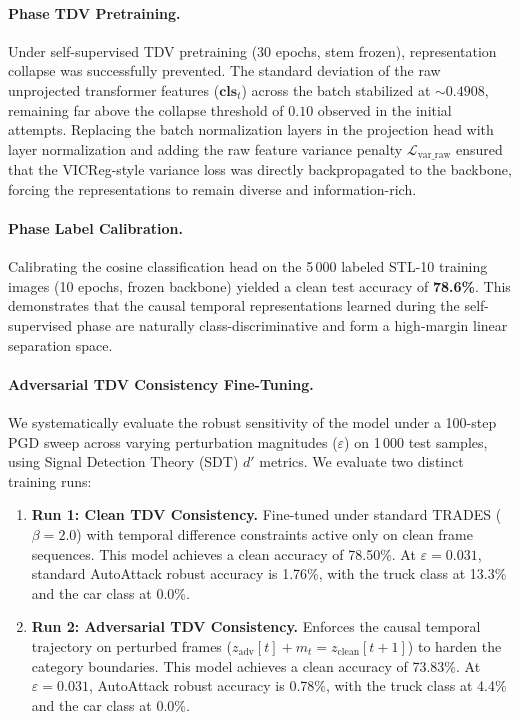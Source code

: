 \documentclass[12pt,a4paper]{article}
\begin{document}
\paragraph{Phase TDV Pretraining.} Under self-supervised TDV pretraining (30 epochs, stem frozen), representation collapse was successfully prevented. The standard deviation of the raw unprojected transformer features ($\mathbf{cls}_t$) across the batch stabilized at $\sim 0.4908$, remaining far above the collapse threshold of $0.10$ observed in the initial attempts. Replacing the batch normalization layers in the projection head with layer normalization and adding the raw feature variance penalty $\mathcal{L}_{\text{var\_raw}}$ ensured that the VICReg-style variance loss was directly backpropagated to the backbone, forcing the representations to remain diverse and information-rich.

\paragraph{Phase Label Calibration.} Calibrating the cosine classification head on the 5\,000 labeled STL-10 training images (10 epochs, frozen backbone) yielded a clean test accuracy of \textbf{78.6\%}. This demonstrates that the causal temporal representations learned during the self-supervised phase are naturally class-discriminative and form a high-margin linear separation space.

\paragraph{Adversarial TDV Consistency Fine-Tuning.} 
We systematically evaluate the robust sensitivity of the model under a 100-step PGD sweep across varying perturbation magnitudes ($\varepsilon$) on 1\,000 test samples, using Signal Detection Theory (SDT) $d'$ metrics. We evaluate two distinct training runs:
\begin{enumerate}
    \item \textbf{Run 1: Clean TDV Consistency.} Fine-tuned under standard TRADES ($\beta = 2.0$) with temporal difference constraints active only on clean frame sequences. This model achieves a clean accuracy of 78.50\%. At $\varepsilon = 0.031$, standard AutoAttack robust accuracy is 1.76\%, with the truck class at 13.3\% and the car class at 0.0\%. 
    \item \textbf{Run 2: Adversarial TDV Consistency.} Enforces the causal temporal trajectory on perturbed frames ($z_{\text{adv}}[t] + m_t = z_{\text{clean}}[t+1]$) to harden the category boundaries. This model achieves a clean accuracy of 73.83\%. At $\varepsilon = 0.031$, AutoAttack robust accuracy is 0.78\%, with the truck class at 4.4\% and the car class at 0.0\%.
\end{enumerate}
\end{document}
